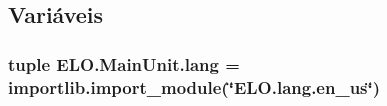 \subsection{Variáveis}
\hypertarget{namespaceELO_1_1MainUnit_a7261ae58058821c58db5b6c3e02d830d}{
\subsubsection[{lang}]{\setlength{\rightskip}{0pt plus 5cm}tuple E\-L\-O.\-Main\-Unit.\-lang = importlib.\-import\-\_\-module(\char`\"{}E\-L\-O.\-lang.\-en\-\_\-us\char`\"{})}}\label{namespaceELO_1_1MainUnit_a7261ae58058821c58db5b6c3e02d830d}
